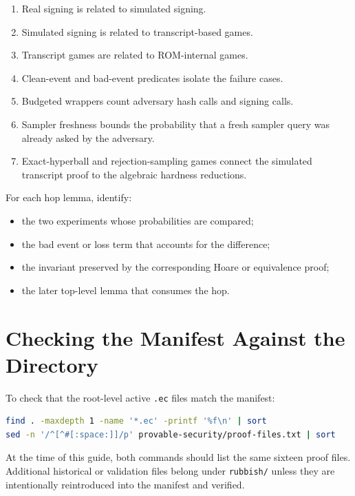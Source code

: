 \documentclass[11pt]{article}
\newcommand{\file}[1]{\nolinkurl{#1}}
\begin{document}
\begin{enumerate}[leftmargin=*]
  \item Real signing is related to simulated signing.
  \item Simulated signing is related to transcript-based games.
  \item Transcript games are related to ROM-internal games.
  \item Clean-event and bad-event predicates isolate the failure cases.
  \item Budgeted wrappers count adversary hash calls and signing calls.
  \item Sampler freshness bounds the probability that a fresh sampler query was
  already asked by the adversary.
  \item Exact-hyperball and rejection-sampling games connect the simulated
  transcript proof to the algebraic hardness reductions.
\end{enumerate}

For each hop lemma, identify:

\begin{itemize}[leftmargin=*]
  \item the two experiments whose probabilities are compared;
  \item the bad event or loss term that accounts for the difference;
  \item the invariant preserved by the corresponding Hoare or equivalence proof;
  \item the later top-level lemma that consumes the hop.
\end{itemize}

\section{Checking the Manifest Against the Directory}

To check that the root-level active \file{.ec} files match the manifest:

\begin{lstlisting}[language=bash]
find . -maxdepth 1 -name '*.ec' -printf '%f\n' | sort
sed -n '/^[^#[:space:]]/p' provable-security/proof-files.txt | sort
\end{lstlisting}

At the time of this guide, both commands should list the same sixteen proof
files.  Additional historical or validation files belong under \file{rubbish/}
unless they are intentionally reintroduced into the manifest and verified.
\end{document}
